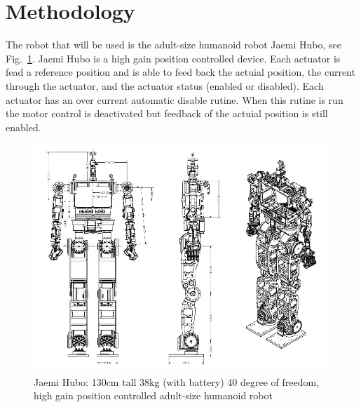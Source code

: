 \section{Methodology}

The robot that will be used is the adult-size humanoid robot Jaemi Hubo, see Fig.~\ref{fig:huboSch}.  Jaemi Hubo is a high gain position controlled device.  Each actuator is fead a reference position and is able to feed back the actuial position, the current through the actuator, and the actuator status (enabled or disabled).  Each actuator has an over current automatic disable rutine.  When this rutine is run the motor control is deactivated but feedback of the actuial position is still enabled.

\begin{figure}[thpb]
  \centering
\includegraphics[width=1.0\columnwidth]{./pix/huboSch.png}
  \caption{Jaemi Hubo: 130cm tall 38kg (with battery) 40 degree of freedom, high gain position controlled adult-size humanoid robot }
  \label{fig:huboSch}
\end{figure}